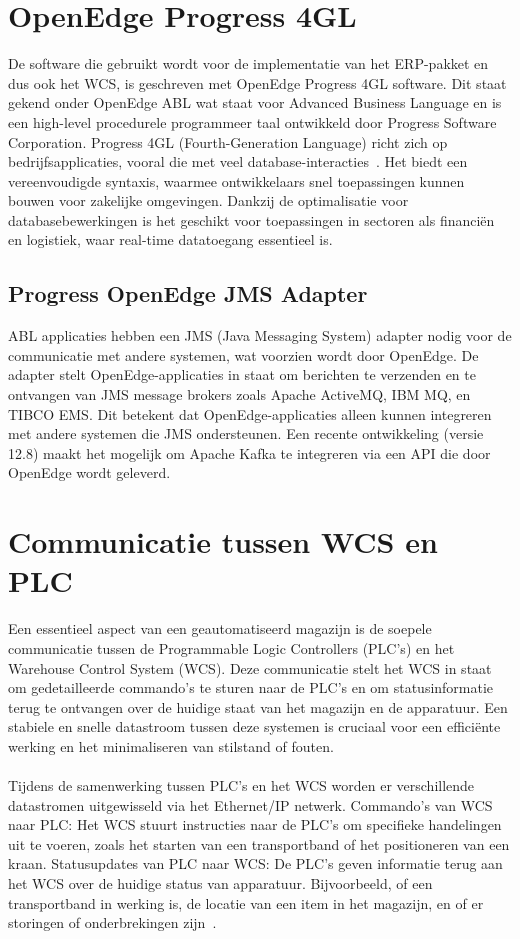 \section{OpenEdge Progress 4GL} 
De software die gebruikt wordt voor de implementatie van het ERP-pakket en dus ook het WCS, is geschreven met OpenEdge Progress 4GL software.
Dit staat gekend onder OpenEdge ABL wat staat voor Advanced Business Language en is een high-level procedurele programmeer taal ontwikkeld door Progress Software Corporation.
Progress 4GL (Fourth-Generation Language) richt zich op bedrijfsapplicaties, vooral die met veel database-interacties~\autocite{OpenEdge2017}. 
Het biedt een vereenvoudigde syntaxis, waarmee ontwikkelaars snel toepassingen kunnen bouwen voor zakelijke omgevingen.
Dankzij de optimalisatie voor databasebewerkingen is het geschikt voor toepassingen in sectoren als financiën en logistiek, 
waar real-time datatoegang essentieel is.
 
\subsection{Progress OpenEdge JMS Adapter}
ABL applicaties hebben een JMS (Java Messaging System) adapter nodig voor de communicatie met andere systemen, wat voorzien wordt door OpenEdge.
De adapter stelt OpenEdge-applicaties in staat om berichten te verzenden en te ontvangen van JMS message brokers zoals Apache ActiveMQ, IBM MQ, en TIBCO EMS. 
Dit betekent dat OpenEdge-applicaties alleen kunnen integreren met andere systemen die JMS ondersteunen. 
Een recente ontwikkeling (versie 12.8) maakt het mogelijk om Apache Kafka te integreren via een API die door OpenEdge wordt geleverd.

\section{Communicatie tussen WCS en PLC}
Een essentieel aspect van een geautomatiseerd magazijn is de soepele communicatie tussen de Programmable Logic Controllers (PLC’s) en 
het Warehouse Control System (WCS). 
Deze communicatie stelt het WCS in staat om gedetailleerde commando’s te sturen naar de PLC’s en om statusinformatie terug te ontvangen over de huidige staat van het magazijn en de apparatuur. 
Een stabiele en snelle datastroom tussen deze systemen is cruciaal voor een efficiënte werking en het minimaliseren van stilstand of fouten.
\\\\
Tijdens de samenwerking tussen PLC’s en het WCS worden er verschillende datastromen uitgewisseld via het Ethernet/IP netwerk.
Commando’s van WCS naar PLC: Het WCS stuurt instructies naar de PLC’s om specifieke handelingen uit te voeren, zoals het starten van een transportband of het positioneren van een kraan.
Statusupdates van PLC naar WCS: De PLC’s geven informatie terug aan het WCS over de huidige status van apparatuur. Bijvoorbeeld, of een transportband in werking is, 
de locatie van een item in het magazijn, en of er storingen of onderbrekingen zijn~\autocite{Laar2013}.


